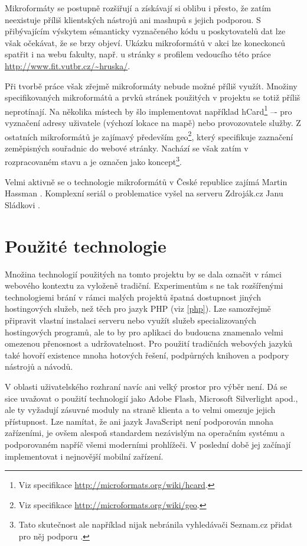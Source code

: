 Mikroformáty se postupně rozšiřují a získávají si oblibu i přesto, že
zatím neexistuje příliš klientských nástrojů ani mashupů s jejich
podporou. S přibývajícím výskytem sémanticky vyznačeného kódu u
poskytovatelů dat lze však očekávat, že se brzy objeví. Ukázku
mikroformátů v akci lze koneckonců spatřit i na webu
fakulty, např. u stránky s profilem vedoucího této práce
\url{http://www.fit.vutbr.cz/~hruska/}.

Při tvorbě práce však zřejmě mikroformáty nebude možné příliš využít.
Množiny specifikovaných mikroformátů a prvků stránek použitých v
projektu se totiž příliš neprotínají. Na několika místech by šlo
implementovat například
hCard\footnote{Viz
specifikace \url{http://microformats.org/wiki/hcard}.} –- pro
vyznačení adresy uživatele (výchozí lokace na mapě) nebo provozovatele služby. Z ostatních mikroformátů je zajímavý především
geo\footnote{Viz specifikace \url{http://microformats.org/wiki/geo}.},
který specifikuje zaznačení zeměpisných souřadnic do webové stránky.
Nachází se však zatím v rozpracovaném stavu a je označen jako
koncept\footnote{Tato skutečnost ale například nijak nebránila vyhledávači Seznam.cz
přidat pro něj podporu \cite{geoSeznam}.}.

Velmi aktivně se o technologie mikroformátů v České republice zajímá
Martin Hassman \cite{mfLupa}. Komplexní seriál o problematice vyšel
na serveru Zdroják.cz Janu Sládkovi \cite{mf}.

\chapter{Použité technologie}\label{technologie}
Množina technologií použitých na tomto projektu by se dala označit v
rámci webového kontextu za vyloženě tradiční. Experimentům s ne tak
rozšířenými technologiemi brání v rámci malých projektů špatná
dostupnost jiných hostingových služeb, než těch pro jazyk PHP (viz
\ref{php}). Lze samozřejmě připravit vlastní instalaci serveru nebo
využít služeb specializovaných hostingových programů, ale to by pro aplikaci do
budoucna znamenalo velmi omezenou přenosnost a udržovatelnost. Pro
použití tradičních webových jazyků také hovoří existence mnoha
hotových řešení, podpůrných knihoven a podpory nástrojů a návodů.

V oblasti uživatelského rozhraní navíc ani velký prostor pro výběr
není. Dá se sice uvažovat o použití technologií jako Adobe Flash, Microsoft
Silverlight apod., ale ty vyžadují zásuvné moduly na straně klienta
a to velmi omezuje jejich přístupnost. Lze namítat, že ani jazyk
JavaScript není podporován mnoha zařízeními, je ovšem alespoň
standardem nezávislým na operačním systému a podporovaném napříč všemi
moderními prohlížeči. V poslední době jej začínají implementovat i
nejnovější mobilní zařízení.

